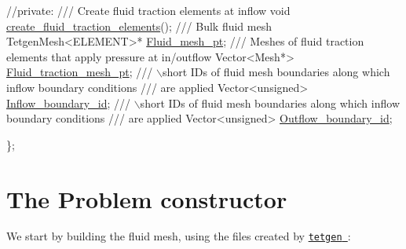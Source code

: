 \begin{DoxyCodeInclude}
 \textcolor{comment}{//private:}
\textcolor{comment}{}
\textcolor{comment}{ /// Create fluid traction elements at inflow}
\textcolor{comment}{} \textcolor{keywordtype}{void} \hyperlink{classUnstructuredFluidProblem_ae95f1912572e8a5f0543eab9c0eb2634}{create\_fluid\_traction\_elements}();
\textcolor{comment}{}
\textcolor{comment}{ /// Bulk fluid mesh}
\textcolor{comment}{} TetgenMesh<ELEMENT>* \hyperlink{classUnstructuredFluidProblem_ade90cb92dd49b9d897ed538b1876b060}{Fluid\_mesh\_pt};
\textcolor{comment}{}
\textcolor{comment}{ /// Meshes of fluid traction elements that apply pressure at in/outflow}
\textcolor{comment}{} Vector<Mesh*> \hyperlink{classUnstructuredFluidProblem_ad2fd96c077dbc69077daaf20a314896c}{Fluid\_traction\_mesh\_pt};
\textcolor{comment}{}
\textcolor{comment}{ /// \(\backslash\)short IDs of fluid mesh boundaries along which inflow boundary conditions}
\textcolor{comment}{ /// are applied}
\textcolor{comment}{} Vector<unsigned> \hyperlink{classUnstructuredFluidProblem_a2923e009bcea7cdbdd7ea5788580a3f8}{Inflow\_boundary\_id};
\textcolor{comment}{}
\textcolor{comment}{ /// \(\backslash\)short IDs of fluid mesh boundaries along which inflow boundary conditions}
\textcolor{comment}{ /// are applied}
\textcolor{comment}{} Vector<unsigned> \hyperlink{classUnstructuredFluidProblem_a9bace139103152045dfe88e3d0163811}{Outflow\_boundary\_id};

\};

\end{DoxyCodeInclude}




 

\hypertarget{index_constructor}{}\section{The Problem constructor}\label{index_constructor}
We start by building the fluid mesh, using the files created by \href{http://wias-berlin.de/software/tetgen//}{\tt {\ttfamily tetgen} }\+:



